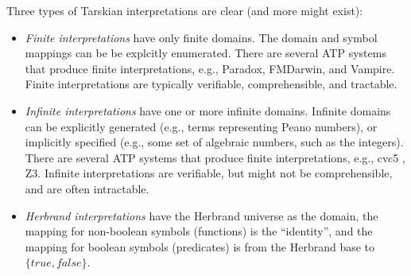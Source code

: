 \documentclass{easychair}
\begin{document}
Three types of Tarskian interpretations are clear (and more might exist):
\begin{itemize}
\item {\em Finite interpretations} have only finite domains.
      The domain and symbol mappings can be be explcitly enumerated.
      There are several ATP systems that produce finite interpretations, e.g., Paradox,
      FMDarwin, and Vampire.
      Finite interpretations are typically verifiable, comprehensible, and tractable.
\item {\em Infinite interpretations} have one or more infinite domains.
      Infinite domains can be explicitly generated (e.g., terms representing Peano numbers), or 
      implicitly specified (e.g., some set of algebraic numbers, such as the integers).
      There are several ATP systems that produce finite interpretations, e.g., 
      cvc5 \cite{BB+22-cvc5}, Z3.
      Infinite interpretations are verifiable, but might not be comprehensible, and are often
      intractable.
\item {\em Herbrand interpretations} \cite{Her30} have the Herbrand universe as the domain, 
      the mapping for non-boolean symbols (functions) is the ``identity'', and the mapping
      for boolean symbols (predicates) is from the Herbrand base to $\{true,false\}$.


\end{itemize}
\end{document}
